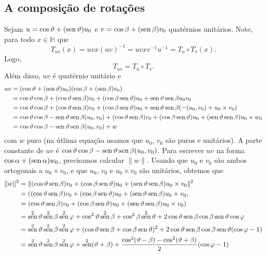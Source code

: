 \documentclass[12pt]{amsart}
\newcommand{\Ha}{\mathbb H}
\DeclareMathOperator{\sen}{\textrm{\rm sen}}
\theoremstyle{definition}
\begin{document}
\subsection{A composição de rotações}
Sejam $u=\cos\vartheta+(\sen\vartheta)u_0$ e $v=\cos\beta+(\sen\beta)v_0$ quatérnios unitários. 
Note, para todo $x\in\Ha$ que 
\[
    T_{uv}(x)=uvx(uv)^{-1}=uvxv^{-1}u^{-1}=T_u\circ T_v(x).
\] 
Logo,
\[
    T_{uv}=T_u\circ T_v.
\]
Além disso, $uv$ é quatérnio unitário e  
\begin{align*}
    uv&=(\cos\vartheta+(\sen\vartheta)u_0)(\cos\beta+(\sen\beta)v_0)\\
    &=\cos\vartheta\cos\beta+(\cos\vartheta\sen\beta) v_0+(\cos\beta\sen\vartheta) u_0+\sen\vartheta\sen\beta u_0 v_0\\
    &=\cos\vartheta\cos\beta+(\cos\vartheta\sen\beta) v_0+(\cos\beta\sen\vartheta) u_0+\sen\vartheta\sen\beta(-(u_0,v_0)+u_0\times v_0)\\
    &=\cos\vartheta\cos\beta -\sen\vartheta\sen\beta(u_0,v_0)+(\cos\vartheta\sen\beta) v_0+(\cos\beta\sen\vartheta) u_0+(\sen\vartheta\sen\beta) u_0\times w_0\\
    &=\cos\vartheta\cos\beta -\sen\vartheta\sen\beta(u_0,v_0)+w
\end{align*} 
com $w$ puro
(na útlima equação usamos que $u_0$, $v_0$ são puros e unitários).
A parte constante de $uv$ é $\cos\vartheta\cos\beta-\sen\vartheta\sen\beta(u_0,v_0)$. Para escrever $uv$ na forma 
$\cos\alpha+(\sen\alpha)w_0$, precisamos calcular $\|w\|$. Usando que $u_0$ e $v_0$ são ambos  
ortogonais a $u_0\times v_0$, e que $u_0$, $v_0$ e $u_0\times v_0$ são unitários, obtemos que 
\begin{align*}
    \|w\|^2&=\|(\cos\vartheta\sen\beta) v_0+(\cos\beta\sen\vartheta) u_0+(\sen\vartheta\sen\beta)u_0\times v_0\|^2\\
    &=((\cos\vartheta\sen\beta) v_0+(\cos\beta\sen\vartheta) u_0+(\sen\vartheta\sen\beta)u_0\times v_0,\\
    &=(\cos\vartheta\sen\beta) v_0+(\cos\beta\sen\vartheta) u_0+(\sen\vartheta\sen\beta)u_0\times v_0)\\
    &=\sen^2\vartheta\sen^2\beta\sen^2\varphi+\cos^2\vartheta\sen^2\beta+\cos^2\beta\sen^2\vartheta+
    2\cos\vartheta\sen\beta\cos\beta\sen\vartheta\cos\varphi\\&=
    \sen^2\vartheta\sen^2\beta\sen^2\varphi+(\cos\vartheta\sen\beta+\cos\beta\sen\vartheta)^2+2\cos\vartheta\sen\beta\cos\beta\sen\vartheta(\cos\varphi-1)\\
    &=\sen^2\vartheta\sen^2\beta\sen^2\varphi+\sen^2(\vartheta+\beta)+\frac{\cos^2(\vartheta-\beta)-\cos^2(\vartheta+\beta)}{2}(\cos\varphi-1)\\
\end{align*}
\end{document}
